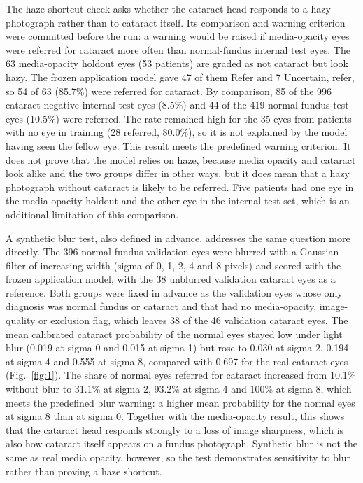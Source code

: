 \documentclass[conference,a4paper]{IEEEtran}
\begin{document}
The haze shortcut check asks whether the cataract head responds to a hazy photograph rather than to
cataract itself. Its comparison and warning criterion were committed before the run: a warning would
be raised if media-opacity eyes were referred for cataract more often than normal-fundus internal
test eyes. The 63 media-opacity holdout eyes (53 patients) are graded as not cataract but look hazy.
The frozen application model gave 47 of them Refer and 7 Uncertain, refer, so 54 of 63 (85.7\%) were
referred for cataract. By comparison, 85 of the 996 cataract-negative internal test eyes (8.5\%) and
44 of the 419 normal-fundus test eyes (10.5\%) were referred. The rate remained high for the 35 eyes
from patients with no eye in training (28 referred, 80.0\%), so it is not explained by the model
having seen the fellow eye. This result meets the predefined warning criterion. It does not prove
that the model relies on haze, because media opacity and cataract look alike and the two groups
differ in other ways, but it does mean that a hazy photograph without cataract is likely to be
referred. Five patients had one eye in the media-opacity holdout and the other eye in
the internal test set, which is an additional limitation of this comparison.

A synthetic blur test, also defined in advance, addresses the same question more directly. The 396
normal-fundus validation eyes were blurred with a Gaussian filter of increasing width (sigma of 0,
1, 2, 4 and 8 pixels) and scored with the frozen application model, with the 38 unblurred validation
cataract eyes as a reference. Both groups were fixed in advance as the validation eyes whose only
diagnosis was normal fundus or cataract and that had no media-opacity, image-quality or exclusion
flag, which leaves 38 of the 46 validation cataract eyes. The mean calibrated cataract probability
of the normal eyes stayed low under light blur (0.019 at sigma 0 and 0.015 at sigma 1) but rose to
0.030 at sigma 2, 0.194 at sigma 4 and 0.555 at sigma 8, compared with 0.697 for the real cataract
eyes (Fig.~\ref{fig:1}). The share of normal eyes referred for cataract increased from 10.1\%
without blur to 31.1\% at sigma 2, 93.2\% at sigma 4 and 100\% at sigma 8, which meets the
predefined blur warning: a higher mean probability for the normal eyes at sigma 8 than at sigma 0.
Together with the media-opacity result, this shows that the cataract head responds strongly to a
loss of image sharpness, which is also how cataract itself appears on a fundus photograph. Synthetic
blur is not the same as real media opacity, however, so the test demonstrates sensitivity to blur
rather than proving a haze shortcut.
\end{document}
